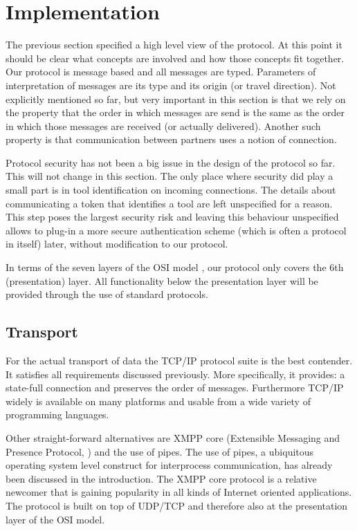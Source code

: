 \documentclass{article}
\begin{document}
\pagebreak
 \section{Implementation} \label{s:protocol_implementation}

   The previous section specified a high level view of the protocol. At this
   point it should be clear what concepts are involved and how those concepts
   fit together. Our protocol is message based and all messages are typed.
   Parameters of interpretation of messages are its type and its origin (or
   travel direction). Not explicitly mentioned so far, but very important in
   this section is that we rely on the property that the order in which
   messages are send is the same as the order in which those messages are
   received (or actually delivered). Another such property is that
   communication between partners uses a notion of connection.
   
   Protocol security has not been a big issue in the design of the protocol so
   far. This will not change in this section. The only place where security did
   play a small part is in tool identification on incoming connections. The
   details about communicating a token that identifies a tool are left
   unspecified for a reason. This step poses the largest security risk and
   leaving this behaviour unspecified allows to plug-in a more secure
   authentication scheme (which is often a protocol in itself) later, without
   modification to our protocol.

   In terms of the seven layers of the OSI model \cite{Day1983}, our protocol
   only covers the 6th (presentation) layer. All functionality below the
   presentation layer will be provided through the use of standard protocols.
   
  \subsection{Transport} \label{ss:transport}

   For the actual transport of data the TCP/IP protocol suite is the best
   contender. It satisfies all requirements discussed previously. More
   specifically, it provides: a state-full connection and preserves the order
   of messages.  Furthermore TCP/IP widely is available on many platforms and
   usable from a wide variety of programming languages.

   Other straight-forward alternatives are XMPP core (Extensible Messaging and
   Presence Protocol, \cite{rfc3920}) and the use of pipes. The use of pipes, a
   ubiquitous operating system level construct for interprocess communication,
   has already been discussed in the introduction. The XMPP core protocol is a
   relative newcomer that is gaining popularity in all kinds of Internet
   oriented applications. The protocol is built on top of UDP/TCP and therefore
   also at the presentation layer of the OSI model.
   
\end{document}
